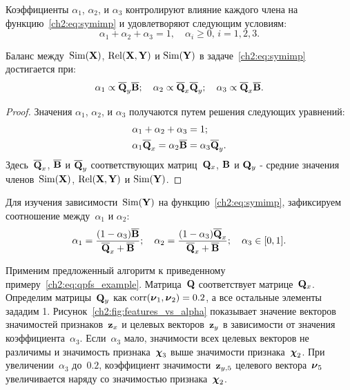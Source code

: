 Коэффициенты $\alpha_1$, $\alpha_2$, и $\alpha_3$ контролируют влияние каждого члена на функцию~\eqref{ch2:eq:symimp} и удовлетворяют следующим условиям:
\begin{equation*}
\alpha_1 + \alpha_2 + \alpha_3 = 1, \quad \alpha_i \geq 0, \, i = 1, 2, 3.
\end{equation*}
\begin{statement}
	Баланс между~$\text{Sim}(\mathbf{X})$, $\text{Rel}(\mathbf{X}, \mathbf{Y})$ и $\text{Sim}(\mathbf{Y})$ в  задаче~\eqref{ch2:eq:symimp} достигается при:
	\begin{equation}
	\alpha_1 \propto \overline{\mathbf{Q}}_y \overline{\mathbf{B}} ; \quad
	\alpha_2 \propto \overline{\mathbf{Q}}_x \overline{\mathbf{Q}}_y; \quad
	\alpha_3  \propto \overline{\mathbf{Q}}_x \overline{\mathbf{B}}.
	\label{ch2:eq:alpha_3}
	\end{equation}
	
\end{statement}
\begin{proof}
	Значения $\alpha_1$, $\alpha_2$, и $\alpha_3$ получаются путем решения следующих уравнений:
	\begin{align*}
	&\alpha_1 + \alpha_2 + \alpha_3 = 1; \\
	&\alpha_1 \overline{\mathbf{Q}}_x = \alpha_2 \overline{\mathbf{B}} = \alpha_3 \overline{\mathbf{Q}}_y.
	\end{align*}
	Здесь~$\overline{\mathbf{Q}}_x$, $\overline{\mathbf{B}}$ и $\overline{\mathbf{Q}}_y$ соответствующих матриц~$\mathbf{Q}_x$, $\mathbf{B}$ и $\mathbf{Q}_y$ - средние значения членов~$\text{Sim}(\mathbf{X})$, $\text{Rel}(\mathbf{X}, \mathbf{Y})$ и $\text{Sim}(\mathbf{Y})$.
\end{proof}
Для изучения зависимости~$\text{Sim}(\mathbf{Y})$ на функцию~\eqref{ch2:eq:symimp}, зафиксируем соотношение между~$\alpha_1$ и $\alpha_2$:
\begin{equation}
\alpha_1 = \frac{(1 - \alpha_3)\overline{\mathbf{B}}}{\overline{\mathbf{Q}}_x + \overline{\mathbf{B}}}; \quad
\alpha_2 = \frac{(1 - \alpha_3)\overline{\mathbf{Q}}_x}{\overline{\mathbf{Q}}_x + \overline{\mathbf{B}}}; \quad
\alpha_3 \in [0, 1].
\label{ch2:eq:alphas3}
\end{equation}

Применим предложенный алгоритм к приведенному примеру~\eqref{ch2:eq:qpfs_example}.
Матрица~$\mathbf{Q}$ соответствует матрице~$\mathbf{Q}_x$.
Определим матрицы~$\mathbf{Q}_y$ как $\text{corr}(\boldsymbol{\nu}_1, \boldsymbol{\nu}_2) = 0.2$, а все остальные элементы зададим 1.
Рисунок~\ref{ch2:fig:features_vs_alpha} показывает значение векторов значимостей признаков~$\mathbf{z}_x$ и целевых векторов~$\mathbf{z}_y$ в зависимости от значения коэффициента~$\alpha_3$.
Если~$\alpha_3$ мало, значимости всех целевых векторов не различимы и значимость признака~$\boldsymbol{\chi}_3$ выше значимости признака~$\boldsymbol{\chi}_2$. При увеличении~$\alpha_3$ до~$0.2$, коэффициент значимости~$\mathbf{z}_{y,5}$ целевого вектора~$\boldsymbol{\nu}_5$ увеличивается наряду со значимостью признака~$\boldsymbol{\chi}_2$.


